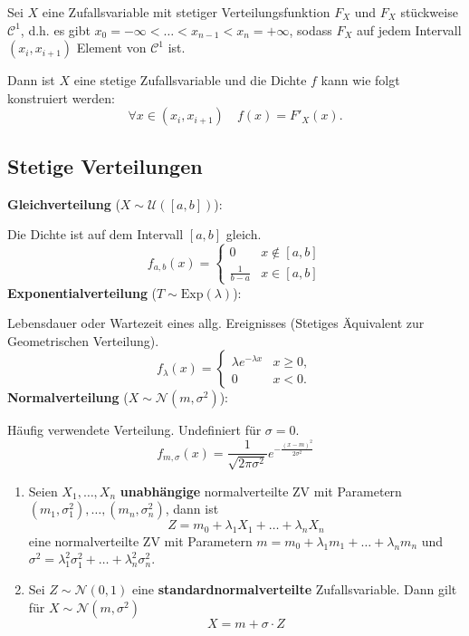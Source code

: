 Sei $X$ eine Zufallsvariable mit stetiger Verteilungsfunktion $F_X$ und $F_X$ stückweise $\mathcal{C}^1$, d.h. es gibt $x_0 = - \infty < \ldots < x_{n-1} < x_n = +\infty$, sodass $F_X$ auf jedem Intervall $(x_i, x_{i+1})$ Element von $\mathcal{C}^1$ ist. 

Dann ist $X$ eine stetige Zufallsvariable und die Dichte $f$ kann wie folgt konstruiert werden:
$$\forall x \in (x_i, x_{i+1}) \quad f(x) = F'_X(x).$$

\subsection{Stetige Verteilungen}
\textbf{Gleichverteilung} ($X \sim \mathcal{U}([a,b])$): 

Die Dichte ist auf dem Intervall $[a, b]$ gleich. 
$$f_{a,b}(x) = \begin{cases}
    0 & x \notin [a,b]\\
    \frac{1}{b-a} & x \in [a,b]
\end{cases}$$
\textbf{Exponentialverteilung} ($T \sim \text{Exp}(\lambda)$): 

Lebensdauer oder Wartezeit eines allg. Ereignisses (Stetiges Äquivalent zur Geometrischen Verteilung). 
$$f_\lambda(x) = \begin{cases}
    \lambda e^{-\lambda x} & x \ge 0,\\
    0 & x < 0.
\end{cases}$$ 
\textbf{Normalverteilung} ($X \sim \mathcal{N}(m, \sigma^2)$): 

Häufig verwendete Verteilung. Undefiniert für $\sigma = 0$.
$$f_{m, \sigma}(x) = \frac{1}{\sqrt{2\pi\sigma^2}}e^{-\frac{(x-m)^2}{2\sigma^2}}$$
\begin{enumerate}
    \item Seien $X_1, \ldots, X_n$ \textbf{unabhängige} normalverteilte ZV mit Parametern $(m_1,\sigma_1^2), \ldots, (m_n, \sigma_n^2)$, dann ist 
    $$Z = m_0 + \lambda_1 X_1 + \ldots + \lambda_n X_n$$
    eine normalverteilte ZV mit Parametern $m = m_0 + \lambda_1 m_1 + \ldots + \lambda_n m_n$ und $\sigma^2 = \lambda_1^2 \sigma_1^2 + \ldots + \lambda_n^2 \sigma_n^2$.
    \item Sei $Z \sim \mathcal{N}(0,1)$ eine \textbf{standardnormalverteilte} Zufallsvariable. Dann gilt für $X \sim \mathcal{N}(m, \sigma^2)$ 
    $$X = m + \sigma \cdot Z$$   
\end{enumerate}

